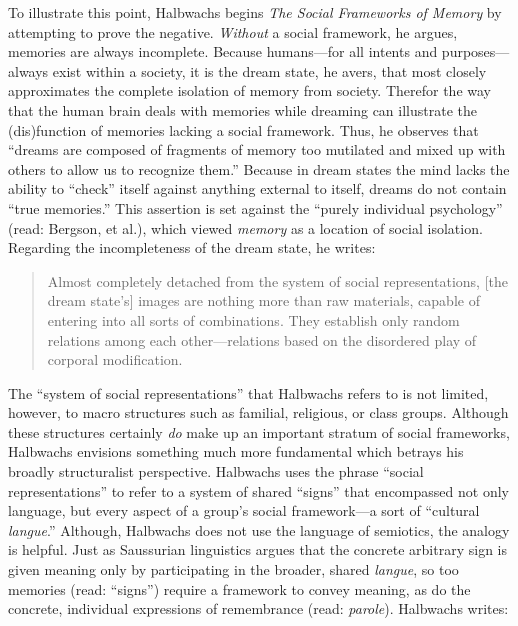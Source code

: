 To illustrate this point, Halbwachs begins \emph{The Social Frameworks
of Memory} by attempting to prove the negative. \emph{Without} a social
framework, he argues, memories are always incomplete. Because
humans---for all intents and purposes---always exist within a society,
it is the dream state, he avers, that most closely approximates the
complete isolation of memory from society. Therefor the way that the
human brain deals with memories while dreaming can illustrate the
(dis)function of memories lacking a social framework. Thus, he observes
that ``dreams are composed of fragments of memory too mutilated and
mixed up with others to allow us to recognize them.'' Because in dream
states the mind lacks the ability to ``check'' itself against anything
external to itself, dreams do not contain ``true
memories.''\autocite[41]{halbwachs1992} This assertion is set against
the ``purely individual psychology'' (read: Bergson, et al.), which
viewed \emph{memory} as a location of social isolation. Regarding the
incompleteness of the dream state, he writes:

\begin{quote}
Almost completely detached from the system of social representations,
{[}the dream state's{]} images are nothing more than raw materials,
capable of entering into all sorts of combinations. They establish only
random relations among each other---relations based on the disordered
play of corporal modification.\autocite[42]{halbwachs1992}
\end{quote}

The ``system of social representations'' that Halbwachs refers to is not
limited, however, to macro structures such as familial, religious, or
class groups. Although these structures certainly \emph{do} make up an
important stratum of social frameworks, Halbwachs envisions something
much more fundamental which betrays his broadly structuralist
perspective. Halbwachs uses the phrase ``social representations'' to
refer to a system of shared ``signs'' that encompassed not only
language, but every aspect of a group's social framework---a sort of
``cultural \emph{langue}.'' Although, Halbwachs does not use the
language of semiotics, the analogy is helpful. Just as Saussurian
linguistics argues that the concrete arbitrary sign is given meaning
only by participating in the broader, shared \emph{langue}, so too
memories (read: ``signs'') require a framework to convey meaning, as do
the concrete, individual expressions of remembrance (read:
\emph{parole}). Halbwachs writes:

